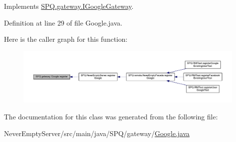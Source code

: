 Implements \mbox{\hyperlink{interface_s_p_q_1_1gateway_1_1_i_google_gateway_a35bfcf888bfbf45ab05f33c89348052a}{S\+P\+Q.\+gateway.\+I\+Google\+Gateway}}.



Definition at line 29 of file Google.\+java.

Here is the caller graph for this function\+:
\nopagebreak
\begin{figure}[H]
\begin{center}
\leavevmode
\includegraphics[width=350pt]{class_s_p_q_1_1gateway_1_1_google_ab287ce4fd789224c45be6037a99a937b_icgraph}
\end{center}
\end{figure}


The documentation for this class was generated from the following file\+:\begin{DoxyCompactItemize}
\item 
Never\+Empty\+Server/src/main/java/\+S\+P\+Q/gateway/\mbox{\hyperlink{_google_8java}{Google.\+java}}\end{DoxyCompactItemize}
